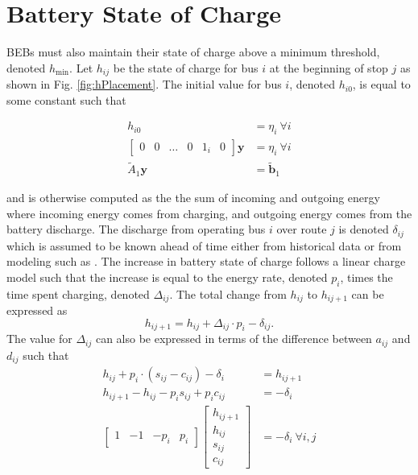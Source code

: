 \section{Battery State of Charge\label{sec:5_battery}}
BEBs must also maintain their state of charge above a minimum threshold, denoted $h_{\text{min}}$. Let $h_{ij}$ be the state of charge for bus $i$ at the beginning of stop $j$ as shown in Fig. \ref{fig:hPlacement}. The initial value for bus $i$, denoted $h_{i0}$, is equal to some constant such that

\begin{equation}\label{eqn:initialSoc0}\begin{aligned}
	h_{i0} &= \eta_{i} \ \forall i \\
	\begin{bmatrix}0 & 0 & \hdots & 0 & 1_i& 0 \end{bmatrix}\mathbf{y} &= \eta_i \ \forall i \\
		\tilde{A}_1\mathbf{y} &= \tilde{\mathbf{b}}_1
\end{aligned} \end{equation}

and is otherwise computed as the the sum of incoming and outgoing energy where incoming energy comes from charging, and outgoing energy comes from the battery discharge. The discharge from operating bus $i$ over route $j$ is denoted $\delta_{ij}$ which is assumed to be known ahead of time either from historical data or from modeling such as \cite{Ji_2022_Trip}. The increase in battery state of charge follows a linear charge model such that the increase is equal to the energy rate, denoted $p_i$, times the time spent charging, denoted $\Delta_{ij}$\cite{rong_coordinated_2016}.
The total change from $h_{ij}$ to $h_{ij+1}$ can be expressed as
\begin{equation}
	h_{ij+1} = h_{ij} + \Delta_{ij} \cdot p_i - \delta_{ij}.
\end{equation}
The value for $\Delta_{ij}$ can also be expressed in terms of the difference between $a_{ij}$ and $d_{ij}$ such that
\begin{equation}\label{eqn:socDynamic1}\begin{aligned}
	h_{ij} + p_i\cdot \left ( s_{ij} - c_{ij} \right ) - \delta_i &= h_{ij+1}\\
	h_{ij+1} - h_{ij} - p_is_{ij} + p_ic_{ij} &= -\delta_i\\
	\begin{bmatrix} 1 & -1 & -p_i & p_i\end{bmatrix} \begin{bmatrix}h_{ij+1} \\ h_{ij} \\ s_{ij} \\ c_{ij} \end{bmatrix} &= -\delta_i \ \forall i,j
\end{aligned}\end{equation}
